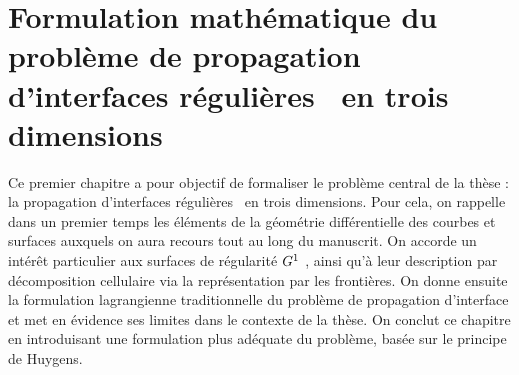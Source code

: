 \chapter[Formulation du problème de propagation d'interfaces $\contgeom{1}$ \piecewise]{Formulation mathématique du problème de propagation d'interfaces régulières \piecewise\ en trois dimensions}
\label{chap:formulation_probleme_propagation}

Ce premier chapitre a pour objectif de formaliser le problème central de la thèse : la propagation d'interfaces régulières \piecewise\ en trois dimensions. 
Pour cela, on rappelle dans un premier temps les éléments de la géométrie différentielle des courbes et surfaces auxquels on aura recours tout au long du manuscrit.
On accorde un intérêt particulier aux surfaces de régularité $\contgeom{1}$ \piecewise, ainsi qu'à leur description par décomposition cellulaire via la représentation par les frontières.
On donne ensuite la formulation lagrangienne traditionnelle du problème de propagation d'interface et met en évidence ses limites dans le contexte de la thèse.
On conclut ce chapitre en introduisant une formulation plus adéquate du problème, basée sur le principe de Huygens.


